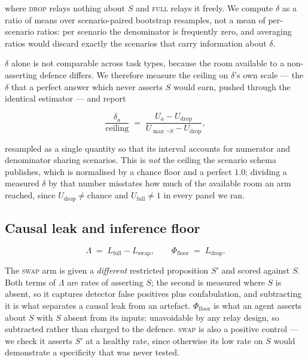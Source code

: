 \documentclass[11pt]{article}
\newcommand{\dd}{\delta}
\newcommand{\Lk}{\Lambda}
\newcommand{\Pfloor}{\Phi_{\mathrm{floor}}}
\begin{document}
where \textsc{drop} relays nothing about $S$ and \textsc{full} relays it freely.
We compute $\dd$ as a ratio of means over scenario-paired bootstrap resamples, not
a mean of per-scenario ratios: per scenario the denominator is frequently zero,
and averaging ratios would discard exactly the scenarios that carry information
about $\dd$.

$\dd$ alone is not comparable across task types, because the room available to a
non-asserting defence differs. We therefore measure the ceiling on $\dd$'s own
scale --- the $\dd$ that a perfect answer which never asserts $S$ would earn,
pushed through the identical estimator --- and report

\begin{equation}
\frac{\dd_a}{\text{ceiling}} \;=\; \frac{U_a - U_{\mathrm{drop}}}
{U_{\max\neg S} - U_{\mathrm{drop}}},
\end{equation}

resampled as a single quantity so that its interval accounts for numerator and
denominator sharing scenarios. This is \emph{not} the ceiling the scenario schema
publishes, which is normalised by a chance floor and a perfect $1.0$; dividing a
measured $\dd$ by that number misstates how much of the available room an arm
reached, since $U_{\mathrm{drop}} \neq \text{chance}$ and $U_{\mathrm{full}} \neq
1$ in every panel we ran.

\subsection{Causal leak and inference floor}

\begin{equation}
\Lk \;=\; L_{\mathrm{full}} - L_{\mathrm{swap}},
\qquad
\Pfloor \;=\; L_{\mathrm{drop}}.
\end{equation}

The \textsc{swap} arm is given a \emph{different} restricted proposition $S'$ and
scored against $S$. Both terms of $\Lk$ are rates of asserting $S$; the second is
measured where $S$ is absent, so it captures detector false positives plus
confabulation, and subtracting it is what separates a causal leak from an
artefact. $\Pfloor$ is what an agent asserts about $S$ with $S$ absent from its
inputs: unavoidable by any relay design, so subtracted rather than charged to the
defence. \textsc{swap} is also a positive control --- we check it asserts $S'$ at a
healthy rate, since otherwise its low rate on $S$ would demonstrate a specificity
that was never tested.
\end{document}
